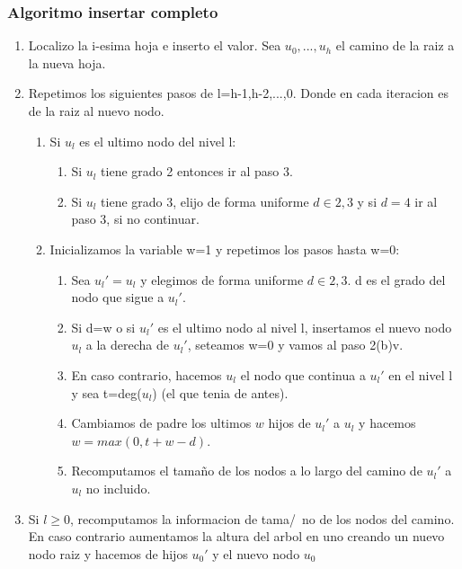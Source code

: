 \documentclass[10pt]{beamer}
\begin{document}
\begin{frame}[noframenumbering]
  \frametitle{Algoritmo insertar completo}
\small
\begin{enumerate}\itemsep0em
  \item Localizo la i-esima hoja e inserto el valor. Sea $u_0,...,u_h$ el camino
    de la raiz a la nueva hoja.
  \item Repetimos los siguientes pasos de l=h-1,h-2,...,0. Donde en cada iteracion
    es de la raiz al nuevo nodo.
    \vspace{-0.05cm}
    \begin{enumerate}[a]\itemsep0em
      \item Si $u_l$ es el ultimo nodo del nivel l:
        \vspace{-0.05cm}
        \begin{enumerate}[i]\itemsep0em
          \item Si $u_l$ tiene grado 2 entonces ir al paso 3.
          \item Si $u_l$ tiene grado 3, elijo de forma uniforme $d\in{2,3}$ y si
            $d=4$ ir al paso 3, si no continuar.
        \end{enumerate}
      \item Inicializamos la variable w=1 y repetimos los pasos hasta w=0:
        \vspace{-0.05cm}
        \begin{enumerate}[i]\itemsep0em
          \item Sea $u_l'=u_l$ y elegimos de forma uniforme $d\in{2,3}$. d es el grado
            del nodo que sigue a $u_l'$.
          \item Si d=w o si $u_l'$ es el ultimo nodo al nivel l, insertamos el nuevo nodo $u_l$
            a la derecha de $u_l'$, seteamos w=0 y vamos al paso 2(b)v.
          \item En caso contrario, hacemos $u_l$ el nodo que continua a $u_l'$ en el nivel l y
            sea t=deg($u_l$) (el que tenia de antes).
          \item Cambiamos de padre los ultimos $w$ hijos de $u_l'$ a $u_l$ y hacemos $w=max(0, t+w-d)$.
          \item Recomputamos el tama\~no de los nodos a lo largo del camino de $u_l'$ a $u_l$ no incluido.
        \end{enumerate}
    \end{enumerate}
  \item Si $l\geq$0, recomputamos la informacion de tama/~no de los nodos del camino.
    En caso contrario aumentamos la altura del arbol en uno creando un nuevo nodo raiz
    y hacemos de hijos $u_0'$ y el nuevo nodo $u_0$
\end{enumerate}

\end{frame}
\end{document}
